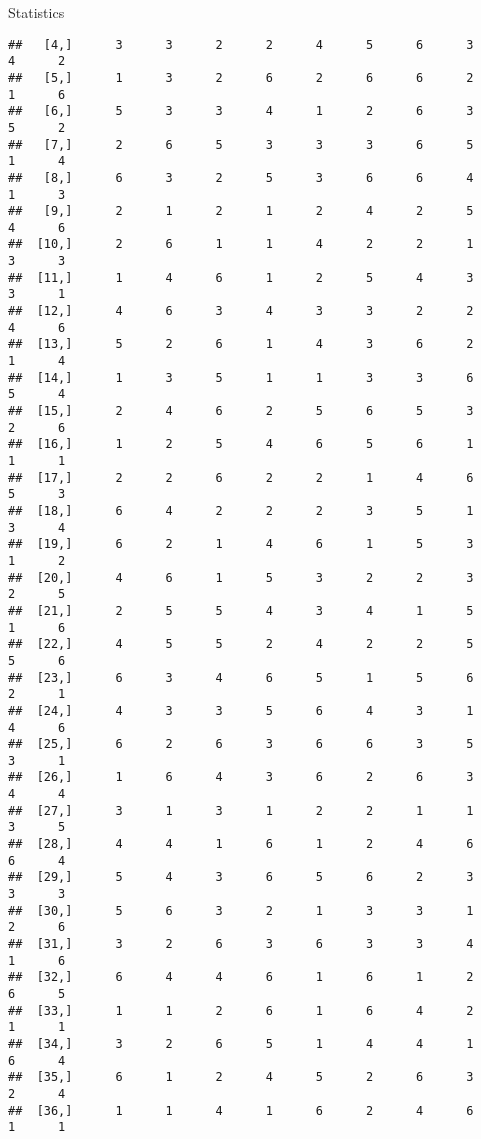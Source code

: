 \documentclass[
  ignorenonframetext,
]{beamer}
\begin{document}
\begin{frame}[fragile]{Statistics}
\begin{verbatim}
##   [4,]      3      3      2      2      4      5      6      3      4      2
##   [5,]      1      3      2      6      2      6      6      2      1      6
##   [6,]      5      3      3      4      1      2      6      3      5      2
##   [7,]      2      6      5      3      3      3      6      5      1      4
##   [8,]      6      3      2      5      3      6      6      4      1      3
##   [9,]      2      1      2      1      2      4      2      5      4      6
##  [10,]      2      6      1      1      4      2      2      1      3      3
##  [11,]      1      4      6      1      2      5      4      3      3      1
##  [12,]      4      6      3      4      3      3      2      2      4      6
##  [13,]      5      2      6      1      4      3      6      2      1      4
##  [14,]      1      3      5      1      1      3      3      6      5      4
##  [15,]      2      4      6      2      5      6      5      3      2      6
##  [16,]      1      2      5      4      6      5      6      1      1      1
##  [17,]      2      2      6      2      2      1      4      6      5      3
##  [18,]      6      4      2      2      2      3      5      1      3      4
##  [19,]      6      2      1      4      6      1      5      3      1      2
##  [20,]      4      6      1      5      3      2      2      3      2      5
##  [21,]      2      5      5      4      3      4      1      5      1      6
##  [22,]      4      5      5      2      4      2      2      5      5      6
##  [23,]      6      3      4      6      5      1      5      6      2      1
##  [24,]      4      3      3      5      6      4      3      1      4      6
##  [25,]      6      2      6      3      6      6      3      5      3      1
##  [26,]      1      6      4      3      6      2      6      3      4      4
##  [27,]      3      1      3      1      2      2      1      1      3      5
##  [28,]      4      4      1      6      1      2      4      6      6      4
##  [29,]      5      4      3      6      5      6      2      3      3      3
##  [30,]      5      6      3      2      1      3      3      1      2      6
##  [31,]      3      2      6      3      6      3      3      4      1      6
##  [32,]      6      4      4      6      1      6      1      2      6      5
##  [33,]      1      1      2      6      1      6      4      2      1      1
##  [34,]      3      2      6      5      1      4      4      1      6      4
##  [35,]      6      1      2      4      5      2      6      3      2      4
##  [36,]      1      1      4      1      6      2      4      6      1      1

\end{verbatim}
\end{frame}
\end{document}
